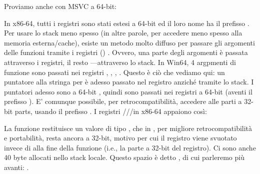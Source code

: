 
Proviamo anche con MSVC a 64-bit:




In x86-64, tutti i registri sono stati estesi a 64-bit ed il loro nome ha il prefisso .
Per usare lo stack meno spesso (in altre parole, per accedere meno spesso alla memoria esterna/cache), esiste un metodo molto diffuso per passare gli argomenti delle funzioni tramite i registri ()
.
Ovvero, una parte degli argomenti è passata attraverso i registri, il resto ---attraverso lo stack.
In Win64, 4 argpmenti di funzione sono passati nei registri \RCX, \RDX, , .
Questo è ciò che vediamo qui: un puntatore alla stringa per \printf è adesso passato nel registro \RCX anziché tramite lo stack.
I puntatori adesso sono a 64-bit , quindi sono passati nei registri a 64-bit (aventi il prefisso ).
E' comunque possibile, per retrocompatibilità, accedere alle parti a 32-bit parts, usando il prefisso .
I registri \RAX/\EAX/\AX/\AL in x86-64 appaiono così:


La funzione \main restituisce un valore di tipo \Tint{}, che in \CCpp, per migliore retrocompatibilità e portabilità, resta ancora a 32-bit, motivo per cui il registro \EAX viene svuotato invece di \RAX{} alla fine della funzione (i.e., la parte a 32-bit
del registro).
Ci sono anche 40 byte allocati nello stack locale.
Questo spazio è detto , di cui parleremo più avanti: .

